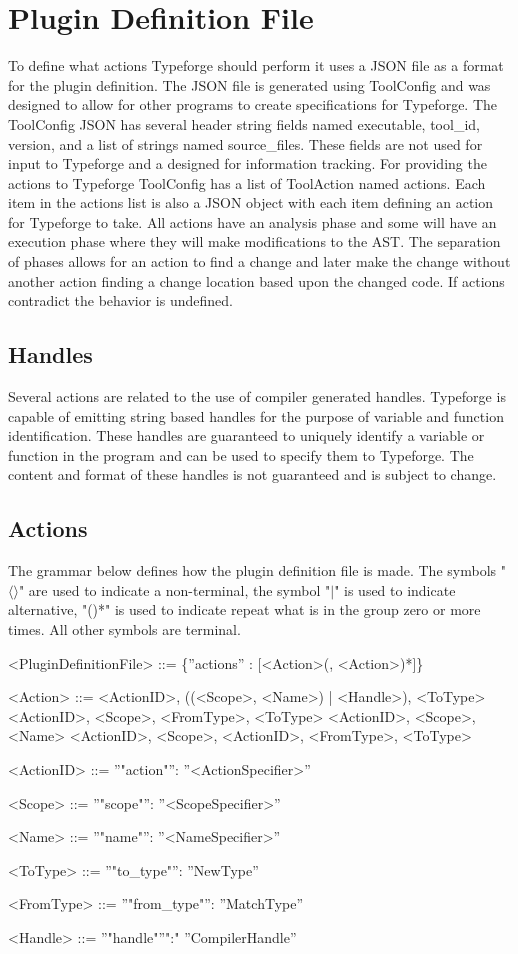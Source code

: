 \documentclass[natbib]{article}
\begin{document}
\section{Plugin Definition File}
To define what actions Typeforge should perform it uses a JSON file as a format for the plugin definition. The JSON file is generated using ToolConfig and was designed to allow for other programs to create specifications for Typeforge. The ToolConfig JSON has several header string fields named executable, tool\_id, version, and a list of strings named source\_files. These fields are not used for input to Typeforge and a designed for information tracking. For providing the actions to Typeforge ToolConfig has a list of ToolAction named actions. Each item in the actions list is also a JSON object with each item defining an action for Typeforge to take. All actions have an analysis phase and some will have an execution phase where they will make modifications to the AST. The separation of phases allows for an action to find a change and later make the change without another action finding a change location based upon the changed code. If actions contradict the behavior is undefined.

\subsection{Handles} \label{sec:handles}
Several actions are related to the use of compiler generated handles. Typeforge is capable of emitting string 
based handles for the purpose of variable and function identification. These handles are guaranteed to 
uniquely identify a variable or function in the program and can be used to specify them to Typeforge. 
The content and format of these handles is not guaranteed and is 
subject to change.

\subsection{Actions}
The grammar below defines how the plugin definition file is made.
The symbols "$\langle\rangle$" are used to indicate a non-terminal, the symbol "$\mid$" is used to 
indicate alternative, "()*" is used to indicate repeat what is in the group zero or more times. 
All other symbols are terminal. 

\begin{grammar}
<PluginDefinitionFile> ::= \{''actions'' : [<Action>(, <Action>)*]\}

<Action>                 ::= <ActionID>, ((<Scope>, <Name>) | <Handle>), <ToType>
\alt <ActionID>, <Scope>, <FromType>, <ToType>
\alt <ActionID>, <Scope>, <Name>
\alt <ActionID>, <Scope>,
\alt <ActionID>, <FromType>, <ToType>

<ActionID> ::= ''"action"'': ''<ActionSpecifier>''

<Scope> ::= ''"scope"'': ''<ScopeSpecifier>''

<Name> ::= ''"name"'': ''<NameSpecifier>''

<ToType> ::= ''"to_type"'': ''NewType''

<FromType> ::= ''"from_type"'': ''MatchType''

<Handle> ::= ''"handle"''":" ''CompilerHandle''
\end{grammar}
\end{document}
